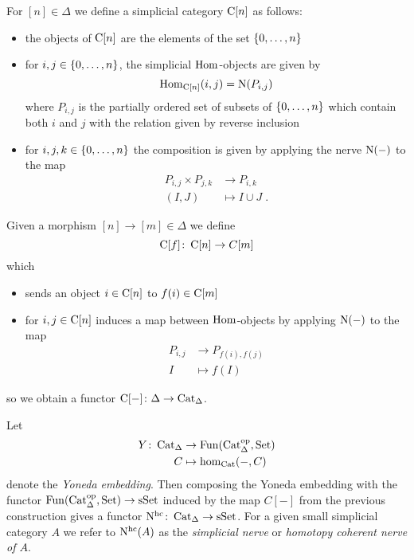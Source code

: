 \begin{construction}%
    For $[n]\in\Delta$ we define a simplicial category $\operatorname{C}[n]$ as follows:
    \begin{itemize}
        \item the objects of $\operatorname{C}[n]$ are the elements of the set $\left\lbrace0,\ldots,n\right\rbrace$
        \item for $i,j\in\left\lbrace0,\ldots,n\right\rbrace$, the simplicial $\operatorname{Hom}$-objects are given by 
            \begin{equation*}
                \operatorname{Hom}_{\operatorname{C}[n]}(i,j)=\operatorname{N}(P_{i,j})
            \end{equation*}
            where $P_{i,j}$ is the partially ordered set of subsets of $\left\lbrace0,\ldots,n\right\rbrace$ which contain both $i$ and $j$ with the relation given by reverse inclusion
        \item for $i,j,k\in\left\lbrace0,\ldots,n\right\rbrace$ the composition is given by applying the nerve $\operatorname{N}(-)$ to the map
        \begin{align*}
                P_{i,j}\times P_{j,k}&\to P_{i,k}\\
                (I,J)&\mapsto I\cup J\;.
        \end{align*}
    \end{itemize}
    Given a morphism $[n]\to[m]\in\Delta$ we define
    \begin{equation*}
        \operatorname{C}[f]\colon\operatorname{C}[n]\to C[m]
    \end{equation*}
    which
    \begin{itemize}
        \item sends an object $i\in\operatorname{C}[n]$ to $f(i)\in\operatorname{C}[m]$
        \item for $i,j\in\operatorname{C}[n]$ induces a map between $\operatorname{Hom}$-objects by applying $\operatorname{N}(-)$ to the map
            \begin{align*}
                P_{i,j}&\to P_{f(i),f(j)}\\
                I&\mapsto f(I)
            \end{align*}
    \end{itemize}
    so we obtain a functor $\operatorname{C}[-]\colon\Delta\to\operatorname{Cat}_{\Delta}$.
\end{construction}
\begin{definition} %
    Let
    \begin{align*}
        Y\colon\operatorname{Cat}_{\Delta}&\to\operatorname{Fun}(\operatorname{Cat}_{\Delta}^{\operatorname{op}},\operatorname{Set})\\
        C&\mapsto\hom_{\operatorname{Cat}}(-,C)
    \end{align*}
    denote the \emph{Yoneda embedding}.
    Then composing the Yoneda embedding with the functor $\operatorname{Fun}(\operatorname{Cat}_{\Delta}^{\operatorname{op}},\operatorname{Set})\to\operatorname{sSet}$ induced by the map $C[-]$ from the previous construction gives a functor $\operatorname{N^{hc}}\colon\operatorname{Cat}_{\Delta}\to\operatorname{sSet}$.
    For a given small simplicial category $A$ we refer to $\operatorname{N^{hc}}(A)$ as the \emph{simplicial nerve} or \emph{homotopy coherent nerve of $A$}.
\end{definition}
